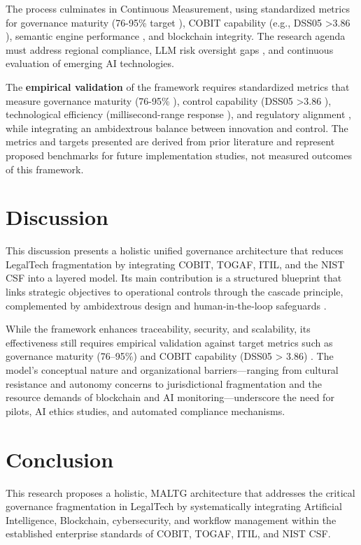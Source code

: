 \documentclass{IET-Conf-Paper}
\begin{document}
    The process culminates in Continuous Measurement, using standardized metrics for governance maturity (76-95\% target \cite{Toapanta2025Perspectives}), COBIT capability (e.g., DSS05 >3.86 \cite{Khairiyah2025Ambidextrous}), semantic engine performance \cite{Chergui2020IT}, and blockchain integrity. The research agenda must address regional compliance, LLM risk oversight gaps \cite{McIntosh2024From}, and continuous evaluation of emerging AI technologies.
    
    The \textbf{empirical validation} of the framework requires standardized metrics that measure governance maturity (76-95\% \cite{Toapanta2025Perspectives}), control capability (DSS05 >3.86 \cite{Khairiyah2025Ambidextrous}), technological efficiency (millisecond-range response \cite{Chergui2020IT}), and regulatory alignment \cite{McIntosh2024From}, while integrating an ambidextrous balance \cite{Lestari2025Designing} between innovation and control.
    The metrics and targets presented are derived from prior literature and represent proposed benchmarks for future implementation studies, not measured outcomes of this framework.
\vspace{-2mm}
\section{Discussion}
    This discussion presents a holistic unified governance architecture that reduces LegalTech fragmentation by integrating COBIT, TOGAF, ITIL, and the NIST CSF into a layered model. Its main contribution is a structured blueprint that links strategic objectives to operational controls through the cascade principle, complemented by ambidextrous design \cite{Lestari2025Designing} and human‑in‑the‑loop safeguards \cite{McIntosh2024From}. 
    
    While the framework enhances traceability, security, and scalability, its effectiveness still requires empirical validation against target metrics such as governance maturity (76–95\%) \cite{Toapanta2025Perspectives} and COBIT capability (DSS05 > 3.86) \cite{Khairiyah2025Ambidextrous}. 
    The model’s conceptual nature and organizational barriers—ranging from cultural resistance and autonomy concerns to jurisdictional fragmentation and the resource demands of blockchain and AI monitoring—underscore the need for pilots, AI ethics studies, and automated compliance mechanisms.
    

\section{Conclusion}
\vspace{-2mm}
    This research proposes a holistic, MALTG architecture that addresses the critical governance fragmentation in LegalTech by systematically integrating Artificial Intelligence, Blockchain, cybersecurity, and workflow management within the established enterprise standards of COBIT, TOGAF, ITIL, and NIST CSF. 
    
\end{document}
